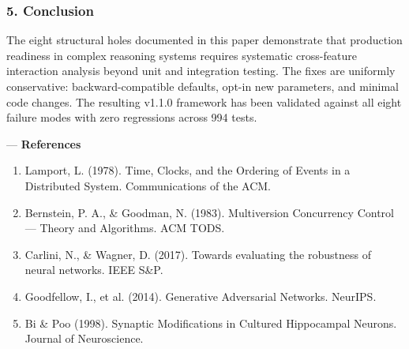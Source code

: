 \documentclass[10pt,journal,compsoc]{IEEEtran}
\begin{document}
\subsubsection{5. Conclusion}
The eight structural holes documented in this paper demonstrate that production readiness in complex reasoning systems requires systematic cross-feature interaction analysis beyond unit and integration testing. The fixes are uniformly conse\-rvative: backward-compatible defaults, opt-in new parameters, and minimal code changes. The resulting v1.1.0 framework has been validated against all eight failure modes with zero regressions across 994 tests.

---
\textbf{References}
\begin{enumerate}
\item Lamport, L. (1978). Time, Clocks, and the Ordering of Events in a Distributed System. Commun\-ications of the ACM.
\item Bernstein, P. A., \& Goodman, N. (1983). Multiv\-ersion Concurrency Control — Theory and Algorithms. ACM TODS.
\item Carlini, N., \& Wagner, D. (2017). Towards evaluating the robustness of neural networks. IEEE S\&P.
\item Goodfellow, I., et al. (2014). Generative Adversarial Networks. NeurIPS.
\item Bi \& Poo (1998). Synaptic Modifi\-cations in Cultured Hippocampal Neurons. Journal of Neuros\-cience.

\end{enumerate}



\end{document}
